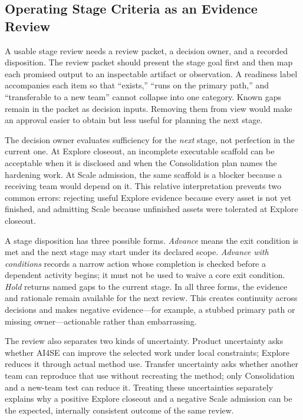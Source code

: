 \documentclass[10pt,conference]{IEEEtran}
\begin{document}
\subsection{Operating Stage Criteria as an Evidence Review}

A usable stage review needs a review packet, a decision owner, and a recorded
disposition.  The review packet should present the stage goal first and then
map each promised output to an inspectable artifact or observation.  A
readiness label accompanies each item so that ``exists,'' ``runs on the
primary path,'' and ``transferable to a new team'' cannot collapse into one
category.  Known gaps remain in the packet as decision inputs.  Removing
them from view would make an approval easier to obtain but less useful for
planning the next stage.

The decision owner evaluates sufficiency for the \emph{next} stage, not
perfection in the current one.  At Explore closeout, an incomplete executable scaffold can
be acceptable when it is disclosed and when the Consolidation plan names the
hardening work.  At Scale admission, the same scaffold is a blocker because a receiving
team would depend on it.  This relative interpretation prevents two common
errors: rejecting useful Explore evidence because every asset is not yet
finished, and admitting Scale because unfinished assets were tolerated at
Explore closeout.

A stage disposition has three possible forms.  \emph{Advance} means the exit
condition is met and the next stage may start under its declared scope.
\emph{Advance with conditions} records a narrow action whose completion is
checked before a dependent activity begins; it must not be used to waive a
core exit condition.  \emph{Hold} returns named gaps to the current stage.
In all three forms, the evidence and rationale remain available for the next
review.  This creates continuity across decisions and makes negative
evidence---for example, a stubbed primary path or missing owner---actionable
rather than embarrassing.

The review also separates two kinds of uncertainty.  Product uncertainty asks
whether AI4SE can improve the selected work under local constraints; Explore
reduces it through actual method use.  Transfer uncertainty asks whether
another team can reproduce that use without recreating the method; only
Consolidation and a new-team test can reduce it.  Treating these uncertainties
separately explains why a positive Explore closeout and a negative Scale admission can be the expected,
internally consistent outcome of the same review.
\end{document}

